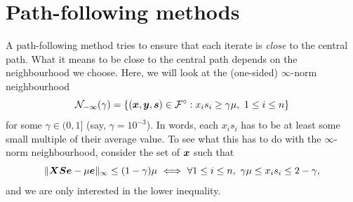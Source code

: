 \section{Path-following methods}
A path-following method tries to ensure that each iterate is {\em close} to the central path. What it means to be close to the central path depends on the neighbourhood we choose. Here, we will look at the (one-sided) $\infty$-norm neighbourhood
\begin{equation*}
\mathcal{N}_{-\infty}(\gamma) = \{(\bm{x},\bm{y},\bm{s})\in \mathcal{F}^{\circ} \mathrel{\mathop{:}} x_is_i\geq \gamma \mu, \ 1\leq i\leq n\}
\end{equation*}
for some $\gamma\in (0,1]$ (say, $\gamma=10^{-3}$). In words, each $x_is_i$ has to be at least some small multiple of their average value. To see what this has to do with the $\infty$-norm neighbourhood, consider the set of $\bm{x}$ such that
\begin{equation*}
 \norm{\mtx{X}\mtx{S}\vct{e}-\mu \vct{e}}_\infty \leq (1-\gamma) \mu \ \Longleftrightarrow \ \forall 1\leq i\leq n, \ \gamma \mu \leq x_is_i \leq 2-\gamma,
\end{equation*}
and we are only interested in the lower inequality.

